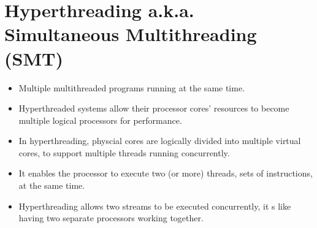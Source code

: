\documentclass[10pt]{report}
\begin{document}
\section{Hyperthreading a.k.a. Simultaneous Multithreading (SMT)}
\begin{itemize}
\item Multiple multithreaded programs running at the same time.
\item Hyperthreaded systems allow their processor cores' resources to become multiple logical processors for performance.
\item In hyperthreading, physcial cores are logically divided into multiple virtual cores, to support multiple threads running concurrently.
\item It enables the processor to execute two (or more) threads, sets of instructions, at the same time.
\item Hyperthreading allows two streams to be executed concurrently, it s like having two separate processors working together.
\end{itemize}
\end{document}
